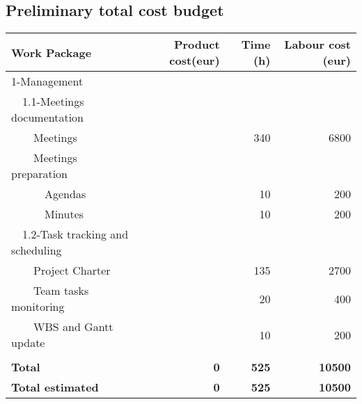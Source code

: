 \subsection{Preliminary total cost budget} 
\begin{tabular}{ | l | r | r | r | }
\hline
Work Package & Product cost(eur) & Time (h) & Labour cost (eur) \\ \hline
1-Management &  &  &  \\ \hline
~~1.1-Meetings documentation & & & \\ \hline
~~~~Meetings & & 340 & 6800 \\ \hline
~~~~Meetings preparation & & & \\ \hline
~~~~~~Agendas & & 10 & 200 \\ \hline
~~~~~~Minutes & & 10 & 200 \\ \hline
~~1.2-Task tracking and scheduling & & & \\ \hline
~~~~Project Charter & & 135 & 2700 \\ \hline
~~~~Team tasks monitoring & & 20 & 400 \\ \hline
~~~~WBS and Gantt update & & 10 & 200 \\ \hline
 &  &  &  \\ \hline
\textbf{Total} & \textbf{0} & \textbf{525} & \textbf{10500} \\ \hline
\textbf{Total estimated} & \textbf{0} & \textbf{525} & \textbf{10500} \\
\hline
\end{tabular}


\pagebreak

